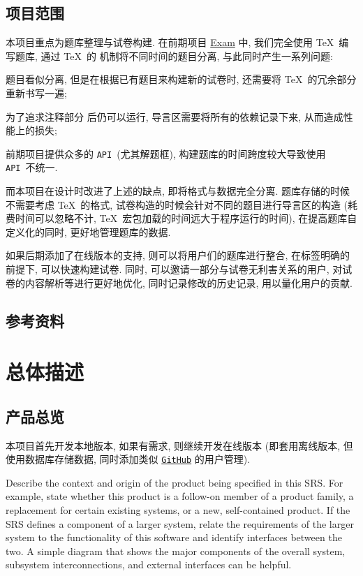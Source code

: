 \documentclass{ctexart}
\newcommand{\github}{\texttt{GitHub}}
\newcommand{\api}{\texttt{API}}
\begin{document}
\subsection{项目范围}
本项目重点为题库整理与试卷构建. 在前期项目 \href{https://github.com/Iydon/LaTeX_template/tree/master/Exam}{Exam} 中, 我们完全使用 \TeX\ 编写题库, 通过 \TeX\ 的 \verb|| 机制将不同时间的题目分离, 与此同时产生一系列问题:
\begin{enumerate*}[label={(\arabic*)}]
    \item 题目看似分离, 但是在根据已有题目来构建新的试卷时, 还需要将 \TeX\ 的冗余部分重新书写一遍;
    \item 为了追求注释部分 \verb|| 后仍可以运行, 导言区需要将所有的依赖记录下来, 从而造成性能上的损失;
    \item 前期项目提供众多的 \api\ (尤其解题框), 构建题库的时间跨度较大导致使用 \api\ 不统一.
\end{enumerate*}

而本项目在设计时改进了上述的缺点, 即将格式与数据完全分离. 题库存储的时候不需要考虑 \TeX\ 的格式, 试卷构造的时候会针对不同的题目进行导言区的构造 (耗费时间可以忽略不计, \TeX\ 宏包加载的时间远大于程序运行的时间), 在提高题库自定义化的同时, 更好地管理题库的数据.

如果后期添加了在线版本的支持, 则可以将用户们的题库进行整合, 在标签明确的前提下, 可以快速构建试卷. 同时, 可以邀请一部分与试卷无利害关系的用户, 对试卷的内容解析等进行更好地优化, 同时记录修改的历史记录, 用以量化用户的贡献.


\subsection{参考资料}
\printbibliography[heading=none]



\section{总体描述}\label{S:overall-description}
\subsection{产品总览}
本项目首先开发本地版本, 如果有需求, 则继续开发在线版本 (即套用离线版本, 但使用数据库存储数据, 同时添加类似 \href{https://github.com/Iydon}{\github} 的用户管理).

Describe the context and origin of the product being specified in this SRS.  
For example, state whether this product is a follow-on member of a product 
family, a replacement for certain existing systems, or a new, self-contained 
product. If the SRS defines a component of a larger system, relate the 
requirements of the larger system to the functionality of this software and 
identify interfaces between the two. A simple diagram that shows the major 
components of the overall system, subsystem interconnections, and external 
interfaces can be helpful.
\end{document}
